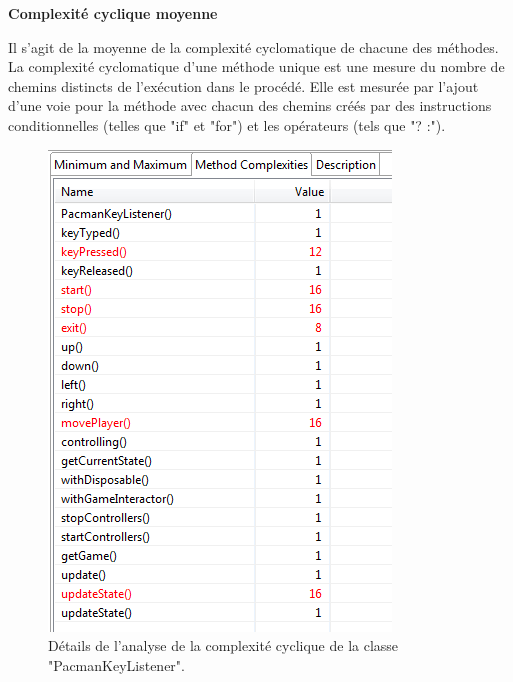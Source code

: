 \documentclass[12pt,a4paper,final]{article}
\newcommand{\smalltitle}[1]{\bigskip\large\textbf{#1}\par\normalsize\medskip}
\begin{document}
\smalltitle{Complexité cyclique moyenne}
Il s'agit de la moyenne de la complexité cyclomatique de chacune des méthodes. La complexité cyclomatique d'une méthode unique est une mesure du nombre de chemins distincts de l'exécution dans le procédé. Elle est mesurée par l'ajout d'une voie pour la méthode avec chacun des chemins créés par des instructions conditionnelles (telles que "if" et "for") et les opérateurs (tels que "? :").
\begin{figure}[!h]
	\centering
	\includegraphics[width=\textwidth]{ACC_PacmanKeyListener.png}
	\caption{\label{ACC1}Détails de l'analyse de la complexité cyclique de la classe "PacmanKeyListener".}
\end{figure}
\end{document}
